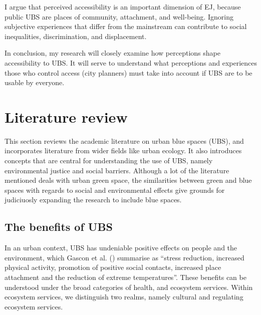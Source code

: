 \documentclass{article}
\begin{document}
I argue that perceived accessibility is an important dimension of EJ, because public UBS are places of community, attachment, and well-being. Ignoring subjective experiences that differ from the mainstream can contribute to social inequalities, discrimination, and displacement.

In conclusion, my research will closely examine how perceptions shape accessibility to UBS. It will serve to understand what perceptions and experiences those who control access (city planners) must take into account if UBS are to be usable by everyone.

\pagebreak
\section{Literature review}

This section reviews the academic literature on urban blue spaces (UBS), and incorporates literature from wider fields like urban ecology. It also introduces concepts that are central for understanding the use of UBS, namely environmental justice and social barriers. Although a lot of the literature mentioned deals with urban green space, the similarities between green and blue spaces with regards to social and environmental effects give grounds for judiciuosly expanding the research to include blue spaces.

\subsection{The benefits of UBS}

In an urban context, UBS has undeniable positive effects on people and the environment, which Gascon et al. (\citeyear{gascon2017outdoor}) summarise as ``stress reduction, increased physical activity, promotion of positive social contacts, increased place attachment and the reduction of extreme temperatures''. These benefits can be understood under the broad categories of health, and ecosystem services. Within ecosystem services, we distinguish two realms, namely cultural and regulating ecosystem services.
\end{document}
